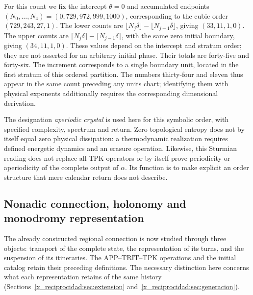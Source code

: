 For this count we fix the intercept \(\theta=0\) and accumulated endpoints \((N_0,\ldots,N_4)=(0,729,972,999,1000)\), corresponding to the cubic order \((729,243,27,1)\). The lower counts are \(\lfloor N_j\delta\rfloor-\lfloor N_{j-1}\delta\rfloor\), giving \((33,11,1,0)\). The upper counts are \(\lceil N_j\delta\rceil-\lceil N_{j-1}\delta\rceil\), with the same zero initial boundary, giving \((34,11,1,0)\). These values depend on the intercept and stratum order; they are not asserted for an arbitrary initial phase. Their totals are forty-five and forty-six. The increment corresponds to a single boundary unit, located in the first stratum of this ordered partition. The numbers thirty-four and eleven thus appear in the same count preceding any units chart; identifying them with physical exponents additionally requires the corresponding dimensional derivation.

The designation \emph{aperiodic crystal} is used here for this symbolic order, with specified complexity, spectrum and return. Zero topological entropy does not by itself equal zero physical dissipation: a thermodynamic realization requires defined energetic dynamics and an erasure operation. Likewise, this Sturmian reading does not replace all TPK operators or by itself prove periodicity or aperiodicity of the complete output of \(\alpha\). Its function is to make explicit an order structure that mere calendar return does not describe.


\subsection{Nonadic connection, holonomy and monodromy representation}
\label{x_reciprocidad:mono-ampl:conexion}

The already constructed regional connection is now studied through three objects:
transport of the complete state, the representation of its turns, and the
suspension of its itineraries. The APP--TRIT--TPK operations and the
initial catalog retain their preceding definitions. The necessary
distinction here concerns what each representation retains of the
same history (Sections~\ref{x_reciprocidad:sec:extension} and~\ref{x_reciprocidad:sec:generacion}).

